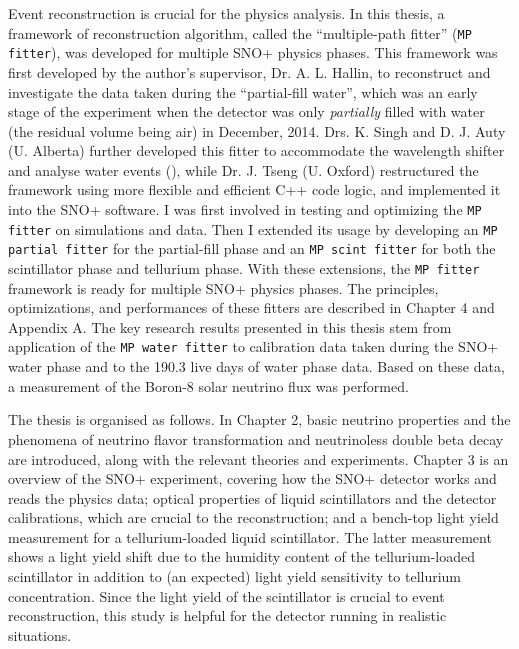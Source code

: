 Event reconstruction is crucial for the physics analysis. In this thesis, a framework of reconstruction algorithm, called the ``multiple-path fitter'' (\texttt{MP fitter}), was developed for multiple SNO+ physics phases. This framework was first developed by the author's supervisor, Dr. A. L. Hallin, to reconstruct and investigate the data taken during the ``partial-fill water'', which was an early stage of the experiment when the detector was only {\em partially} filled with water (the residual volume being air) in December, 2014\cite{partialWater}. Drs. K. Singh and D. J. Auty (U. Alberta) further developed this fitter to accommodate the wavelength shifter and analyse water events (\cite{davidPartialWater, kalpanaWLS, kalpanaWLS2, kalpanaMPFitter}), while Dr. J. Tseng (U. Oxford) restructured the framework using more flexible and efficient C++ code logic, and implemented it into the SNO+ software\cite{jieMPW}. I was first involved in testing and optimizing the \texttt{MP fitter} on simulations and data. Then I extended its usage by developing an \texttt{MP partial fitter} for the partial-fill phase and an \texttt{MP scint fitter} for both the scintillator phase and tellurium phase. With these extensions, the \texttt{MP fitter} framework is ready for multiple SNO+ physics phases. The principles, optimizations, and performances of these fitters are described in Chapter 4 and Appendix A. The key research results presented in this thesis stem from application of the \texttt{MP water fitter} to calibration data taken during the SNO+ water phase and to the 190.3 live days of water phase data. Based on these data, a measurement of the Boron-8 solar neutrino flux was performed.

The thesis is organised as follows. In Chapter 2, basic neutrino properties and the phenomena of neutrino flavor transformation and neutrinoless double beta decay are introduced, along with the relevant theories and experiments. Chapter 3 is an overview of the SNO+ experiment, covering how the SNO+ detector works and reads the physics data; optical properties of liquid scintillators and the detector calibrations, which are crucial to the reconstruction; and a bench-top light yield measurement for a tellurium-loaded liquid scintillator. The latter measurement shows a light yield shift due to the humidity content of the tellurium-loaded scintillator in addition to (an expected) light yield sensitivity to tellurium concentration. Since the light yield of the scintillator is crucial to event reconstruction, this study is helpful for the detector running in realistic situations.

